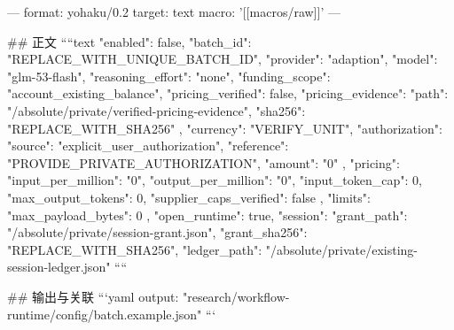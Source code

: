 ---
format: yohaku/0.2
target: text
macro: '[[macros/raw]]'
---

## 正文
````text
{
  "enabled": false,
  "batch_id": "REPLACE_WITH_UNIQUE_BATCH_ID",
  "provider": "adaption",
  "model": "glm-53-flash",
  "reasoning_effort": "none",
  "funding_scope": "account_existing_balance",
  "pricing_verified": false,
  "pricing_evidence": {
    "path": "/absolute/private/verified-pricing-evidence",
    "sha256": "REPLACE_WITH_SHA256"
  },
  "currency": "VERIFY_UNIT",
  "authorization": {
    "source": "explicit_user_authorization",
    "reference": "PROVIDE_PRIVATE_AUTHORIZATION",
    "amount": "0"
  },
  "pricing": {
    "input_per_million": "0",
    "output_per_million": "0",
    "input_token_cap": 0,
    "max_output_tokens": 0,
    "supplier_caps_verified": false
  },
  "limits": {
    "max_payload_bytes": 0
  },
  "open_runtime": true,
  "session": {
    "grant_path": "/absolute/private/session-grant.json",
    "grant_sha256": "REPLACE_WITH_SHA256",
    "ledger_path": "/absolute/private/existing-session-ledger.json"
  }
}
````

## 输出与关联
```yaml
output: "research/workflow-runtime/config/batch.example.json"
```

